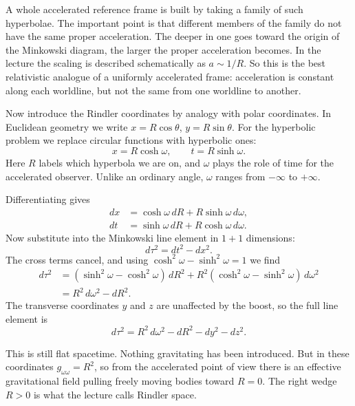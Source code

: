 A whole accelerated reference frame is built by taking a family of such hyperbolae. The important point is that different members of the family do not have the same proper acceleration. The deeper in one goes toward the origin of the Minkowski diagram, the larger the proper acceleration becomes. In the lecture the scaling is described schematically as \(a\sim 1/R\). So this is the best relativistic analogue of a uniformly accelerated frame: acceleration is constant along each worldline, but not the same from one worldline to another.

Now introduce the Rindler coordinates by analogy with polar coordinates. In Euclidean geometry we write \(x=R\cos\theta\), \(y=R\sin\theta\). For the hyperbolic problem we replace circular functions with hyperbolic ones:
\begin{equation}
x=R\cosh\omega,
\qquad
t=R\sinh\omega.
\end{equation}
Here \(R\) labels which hyperbola we are on, and \(\omega\) plays the role of time for the accelerated observer. Unlike an ordinary angle, \(\omega\) ranges from \(-\infty\) to \(+\infty\).

Differentiating gives
\begin{align}
dx &= \cosh\omega\,dR + R\sinh\omega\,d\omega, \\
dt &= \sinh\omega\,dR + R\cosh\omega\,d\omega.
\end{align}
Now substitute into the Minkowski line element in \(1+1\) dimensions:
\begin{equation}
d\tau^2=dt^2-dx^2.
\end{equation}
The cross terms cancel, and using \(\cosh^2\omega-\sinh^2\omega=1\) we find
\begin{align}
d\tau^2
&=
(\sinh^2\omega-\cosh^2\omega)\,dR^2
+
R^2(\cosh^2\omega-\sinh^2\omega)\,d\omega^2
\\
&=
R^2\,d\omega^2-dR^2.
\end{align}
The transverse coordinates \(y\) and \(z\) are unaffected by the boost, so the full line element is
\begin{equation}
d\tau^2 = R^2\,d\omega^2 - dR^2 - dy^2 - dz^2.
\end{equation}

This is still flat spacetime. Nothing gravitating has been introduced. But in these coordinates \(g_{\omega\omega}=R^2\), so from the accelerated point of view there is an effective gravitational field pulling freely moving bodies toward \(R=0\). The right wedge \(R>0\) is what the lecture calls Rindler space.

